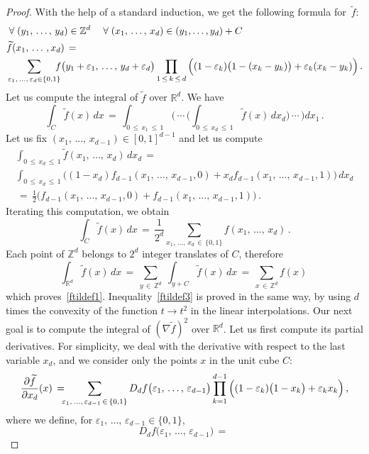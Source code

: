 \documentclass[AHL, Unicode, longabstracts, published]{cedram}
\newcommand*\Zd {{\mathbb Z^d}}
\newcommand*\Rd {{\mathbb R^d}}
\newcommand*\R{\mathbb{R}}
\newcommand*\ft{\widetilde f}
\let\oldforall\forall
\renewcommand*{\forall}{\mathrel{\oldforall}}
\begin{document}
\begin{proof}
With the help of a standard induction, we get the following formula for~$\ft$:
\begin{align*}
&\forall (y_1,\,\dots,\,y_{d})\in \Zd\quad
\forall (x_1,\,\dots,\,x_{d})\in (y_1,\dots,y_{d})+C
\\
&\ft(x_1,\,\dots\,,x_d)\,=\,\\
&\sum_{\varepsilon_1,\,\dots,\,\varepsilon_{d} \in\{0,1\}}
\kern-7pt f\big(y_1+\varepsilon_1,\,\dots,\,y_d+\varepsilon_d\big)
\prod_{1\,\leq\,k\,\leq\,d}\Big((1-\varepsilon_k)\big(1-(x_k-y_k)\big) +\varepsilon_k(x_k-y_k)\Big)
\,.
\end{align*}
Let us compute the integral of $\ft$ over $\R^d$. We have
\[
\int_{C}\ft(x)\,dx\,=\,
\int_{0\,\leq\,x_1\,\leq\,1}\Bigg(\,\cdots
\,\Bigg(\int_{0\,\leq\,x_d\,\leq\,1}
\ft(x)\,dx_d\Bigg)\,\cdots\,\Bigg) dx_1\,.
\]
Let us fix $(x_1,\,\dots,\,x_{d-1})\in [0,1]^{d-1}$ and let us compute
\begin{multline*}
\int_{0\,\leq\,x_d\,\leq\,1}
\ft (x_1,\,\dots,\,x_{d})
\,dx_d\,=\\
\int_{0\,\leq\,x_d\,\leq\,1}
\Big((1-x_d)f_{d-1} (x_1,\,\dots,\,x_{d-1},0) +x_df_{d-1} (x_1,\,\dots,\,x_{d-1},1)
\Big)
\,dx_d\\
\,=\,
\frac{1}{2}\Big(f_{d-1} (x_1,\,\dots,\,x_{d-1},0) +f_{d-1} (x_1,\,\dots,\,x_{d-1},1)
\Big)\,.
\end{multline*}
Iterating this computation, we obtain
\[
\int_{C}\ft(x)\,dx\,=\,
\frac{1}{2^d}\sum_{x_1,\,\dots,\,x_d\,\in\,\{0,1\}}
f (x_1,\,\dots,\,x_{d})\,.
\]
Each point of $\Zd$ belongs to $2^d$ integer translates of $C$, therefore
\[
\int_{\Rd}\ft(x)\,dx\,=\,\sum_{y\,\in\,\Zd}\;
\int_{y+C}\ft(x)\,dx\,=\,
\sum_{x\,\in\,\Zd}f(x)\,
\]
which proves~\eqref{ftildef1}. Inequality~\eqref{ftildef3} is proved in the same way, by using $d$ times the convexity of the function $t\to t^2$ in the linear interpolations. Our next goal is to compute the integral of $(\nabla\ft)^2$ over $\R^d$. Let us first compute its partial derivatives. For simplicity, we deal with the derivative with respect to the last variable $x_d$, and we consider only the points $x$ in the unit cube $C$:
\[
\frac{\partial\ft}{\partial x_d}(x)\,=\,
\kern-7pt
\sum_{\varepsilon_1,\,\dots,\,\varepsilon_{d-1}\,\in\,\{0,1\}}
 D_df\big(\varepsilon_1,\,\dots,\,\varepsilon_{d-1}\big)
\prod_{k=1}^{d-1}\Big((1-\varepsilon_k)\big(1-x_k\big) +\varepsilon_kx_k\Big)
\,,
\]
where we define, for ${\varepsilon_1,\,\dots,\,\varepsilon_{d-1} \in\{0,1\}}$,
\[
D_df\big(\varepsilon_1,\,\dots,\,\varepsilon_{d-1}\big)\,=\,
\]
\end{proof}
\end{document}
